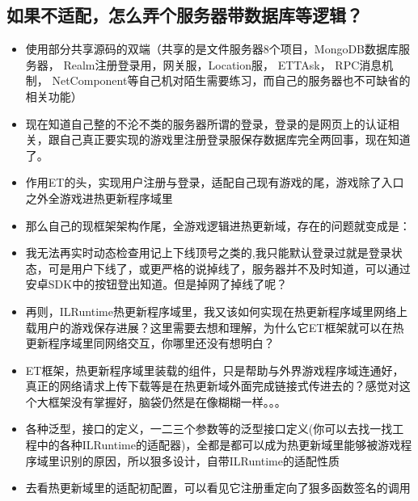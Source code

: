 \documentclass[9pt, b5paper]{article}
\begin{document}
\subsection{如果不适配，怎么弄个服务器带数据库等逻辑？}
\label{sec-3-2}
\begin{itemize}
\item 使用部分共享源码的双端（共享的是文件服务器8个项目，MongoDB数据库服务器， Realm注册登录用，网关服，Location服， ETTAsk， RPC消息机制， NetComponent等自己机对陌生需要练习，而自己的服务器也不可缺省的相关功能）
\item 现在知道自己整的不沦不类的服务器所谓的登录，登录的是网页上的认证相关，跟自己真正要实现的游戏里注册登录服保存数据库完全两回事，现在知道了。
\item 作用ET的头，实现用户注册与登录，适配自己现有游戏的尾，游戏除了入口之外全游戏进热更新程序域里
\item 那么自己的现框架架构作尾，全游戏逻辑进热更新域，存在的问题就变成是：
\item 我无法再实时动态检查用记上下线顶号之类的,我只能默认登录过就是登录状态，可是用户下线了，或更严格的说掉线了，服务器并不及时知道，可以通过安卓SDK中的按钮登出知道。但是掉网了掉线了呢？
\item 再则，ILRuntime热更新程序域里，我又该如何实现在热更新程序域里网络上载用户的游戏保存进展？这里需要去想和理解，为什么它ET框架就可以在热更新程序域里同网络交互，你哪里还没有想明白？
\item ET框架，热更新程序域里装载的组件，只是帮助与外界游戏程序域连通好，真正的网络请求上传下载等是在热更新域外面完成链接式传进去的？感觉对这个大框架没有掌握好，脑袋仍然是在像糊糊一样。。。
\item 各种泛型，接口的定义，一二三个参数等的泛型接口定义(你可以去找一找工程中的各种ILRuntime的适配器)，全都是都可以成为热更新域里能够被游戏程序域里识别的原因，所以狠多设计，自带ILRuntime的适配性质
\item 去看热更新域里的适配初配置，可以看见它注册重定向了狠多函数签名的调用
\end{itemize}
\end{document}
